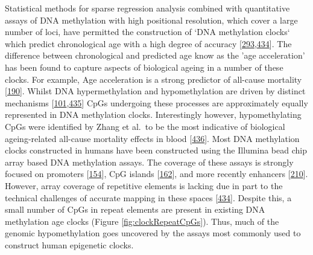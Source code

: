 \documentclass[
]{book}
\begin{document}
Statistical methods for sparse regression analysis combined with quantitative assays of DNA methylation with high positional resolution, which cover a large number of loci, have permitted the construction of `DNA methylation clocks` which predict chronological age with a high degree of accuracy {[}\protect\hyperlink{ref-Horvath2018}{293},\protect\hyperlink{ref-Bell2019}{434}{]}.
The difference between chronological and predicted age know as the 'age acceleration' has been found to capture aspects of biological ageing in a number of these clocks.
For example, Age acceleration is a strong predictor of all-cause mortality {[}\protect\hyperlink{ref-Marioni2015}{190}{]}.
Whilst DNA hypermethylation and hypomethylation are driven by distinct mechanisms {[}\protect\hyperlink{ref-Wu2017}{101},\protect\hyperlink{ref-Mozhui2017}{435}{]} CpGs undergoing these processes are approximately equally represented in DNA methylation clocks.
Interestingly however, hypomethylating CpGs were identified by Zhang et al.~to be the most indicative of biological ageing-related all-cause mortality effects in blood {[}\protect\hyperlink{ref-Zhang2017}{436}{]}.
Most DNA methylation clocks constructed in humans have been constructed using the Illumina bead chip array based DNA methylation assays.
The coverage of these assays is strongly focused on promoters {[}\protect\hyperlink{ref-Bibikova2009}{154}{]}, CpG islands {[}\protect\hyperlink{ref-Bibikova2011}{162}{]}, and more recently enhancers {[}\protect\hyperlink{ref-Moran2015}{210}{]}.
However, array coverage of repetitive elements is lacking due in part to the technical challenges of accurate mapping in these spaces {[}\protect\hyperlink{ref-Bell2019}{434}{]}.
Despite this, a small number of CpGs in repeat elements are present in existing DNA methylation age clocks (Figure \ref{fig:clockRepeatCpGs}).
Thus, much of the genomic hypomethylation goes uncovered by the assays most commonly used to construct human epigenetic clocks.
\end{document}
